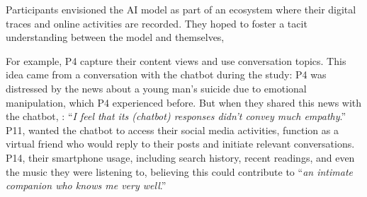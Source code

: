 Participants envisioned the AI model as part of an ecosystem where their digital traces and online activities are recorded. They hoped to foster a tacit understanding between the model and themselves, 

For example, P4  capture their content views and use  conversation topics. 
This idea came from a conversation with the chatbot during the study: P4 was distressed by the news about a young man's suicide due to emotional manipulation, which P4 experienced before. But when they shared this news with the chatbot, : 
``\textit{I feel that its (chatbot) responses didn't convey much empathy}.'' 
P11,  wanted the chatbot to access their social media activities,  function as a virtual friend who would reply to their posts and initiate relevant conversations.
P14,  their smartphone usage, including search history, recent readings, and even the music they were listening to, believing this could contribute to ``\textit{an intimate companion who knows me very well}.'' 



